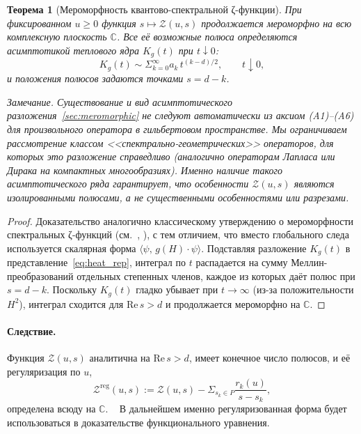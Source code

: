 \documentclass{article}
\numberwithin{equation}{section}
\theoremstyle{plain}
\newtheorem{theorem}{Теорема}
\theoremstyle{definition}
\theoremstyle{remark}
\def\infty{∞}\def\partial{∂}\def\sum{Σ}\def\int{∫}%
\def\cdot{·}\def\times{×}\def\pm{±}\def\mp{∓}\def\approx{≈}%
\begin{document}
\begin{theorem}[Мероморфность квантово-спектральной ζ-функции]
\label{thm:meromorphic}
При фиксированном $u\ge0$ функция $s\mapsto \mathcal Z(u,s)$ продолжается мероморфно на всю комплексную плоскость $\mathbb C$.  
Все её возможные полюса определяются асимптотикой теплового ядра $K_g(t)$ при $t\downarrow0$:
\begin{equation}
\label{sec:meromorphic}
K_g(t)\sim \sum_{k=0}^\infty a_k\,t^{(k-d)/2},
\qquad t\downarrow0,
\end{equation}
и положения полюсов задаются точками $s=d-k$.

\medskip
\noindent
\emph{Замечание.} Существование и вид асимптотического разложения~\eqref{sec:meromorphic} не следуют автоматически из аксиом (A1)--(A6) для произвольного оператора в гильбертовом пространстве. Мы ограничиваем рассмотрение классом <<спектрально-геометрических>> операторов, для которых это разложение справедливо (аналогично операторам Лапласа или Дирака на компактных многообразиях). Именно наличие такого асимптотического ряда гарантирует, что особенности $\mathcal{Z}(u,s)$ являются изолированными полюсами, а не существенными особенностями или разрезами.
\end{theorem}

\begin{proof}
Доказательство аналогично классическому утверждению о мероморфности спектральных ζ-функций (см.~\cite{Seeley1967}, \cite{Gilkey1995}), с тем отличием, что вместо глобального следа используется скалярная форма $\langle\psi,\,g(H)\cdot\psi\rangle$.  
Подставляя разложение $K_g(t)$ в представление~\eqref{eq:heat_rep}, интеграл по $t$ распадается на сумму Меллин-преобразований отдельных степенных членов, каждое из которых даёт полюс при $s=d-k$.  
Поскольку $K_g(t)$ гладко убывает при $t\to\infty$ (из-за положительности $H^2$), интеграл сходится для $\mathrm{Re}\,s>d$ и продолжается мероморфно на $\mathbb C$.
\end{proof}

\paragraph{Следствие.}  
Функция $\mathcal Z(u,s)$ аналитична на $\mathrm{Re}\,s>d$, имеет конечное число полюсов, и её регуляризация по $u$,
\begin{equation}
\mathcal Z^{\mathrm{reg}}(u,s)
:=\mathcal Z(u,s)-\sum_{s_k\in P}\frac{r_k(u)}{s-s_k},
\end{equation}
определена всюду на $\mathbb C$.  ~\cite{Elizalde1995}
В дальнейшем именно регуляризованная форма будет использоваться в доказательстве функционального уравнения.
\end{document}
